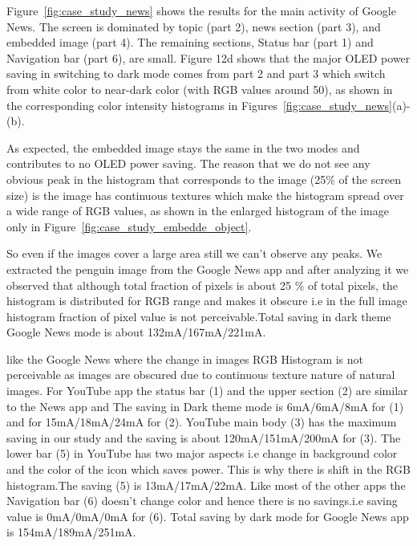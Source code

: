 Figure~\ref{fig:case_study_news} shows the results
for the main activity of Google News.  The screen is dominated by
topic (part 2), news section (part 3), and embedded image (part 4).
The remaining sections, Status bar (part 1) and Navigation bar (part
6), are small.
Figure 12d shows that the major OLED power saving in switching to dark mode comes from
part 2 and part 3 which switch from white color to near-dark color
(with RGB values around 50), as shown
in the corresponding color intensity histograms 
in Figures~\ref{fig:case_study_news}(a)-(b).

As expected, the embedded image stays the same
in the two modes and contributes to no OLED power saving. 
The reason that we do not see any obvious peak in the histogram that corresponds to
the image (25\% of the screen size) is 
the image has continuous textures which make the histogram spread over
a wide range of RGB values, as shown in the enlarged histogram of
the 
image only in Figure~\ref{fig:case_study_embedde_object}.

So even if the images cover a large area still we
can't observe any peaks. We extracted the penguin image from the Google News
app and  after analyzing it we observed that although total fraction of pixels
is about 25 \% of total pixels, the histogram is distributed for RGB range and
makes it obscure i.e in the full image histogram fraction of pixel value is not
perceivable.Total saving in dark theme Google News mode is about 132mA/167mA/221mA.
\fi


like the Google News where the change in images RGB Histogram is not
perceivable as images are obscured due to continuous texture nature of
natural images. For YouTube app the status bar (1) and the upper section (2)
are similar to the News app and The saving in Dark theme mode is
6mA/6mA/8mA for (1) and for 15mA/18mA/24mA for (2). YouTube main body (3) has
the maximum saving in our study and the saving is about 120mA/151mA/200mA for (3).
The lower bar (5) in YouTube has two major aspects i.e change in background
color and the color of the icon which saves power. This is why there is shift
in the RGB histogram.The saving (5) is  13mA/17mA/22mA. Like most of the other
apps the Navigation bar (6) doesn't change color and hence there is no
savings.i.e saving value is 0mA/0mA/0mA for (6).
Total saving by dark mode for Google News app is 154mA/189mA/251mA.
\fi

% 

